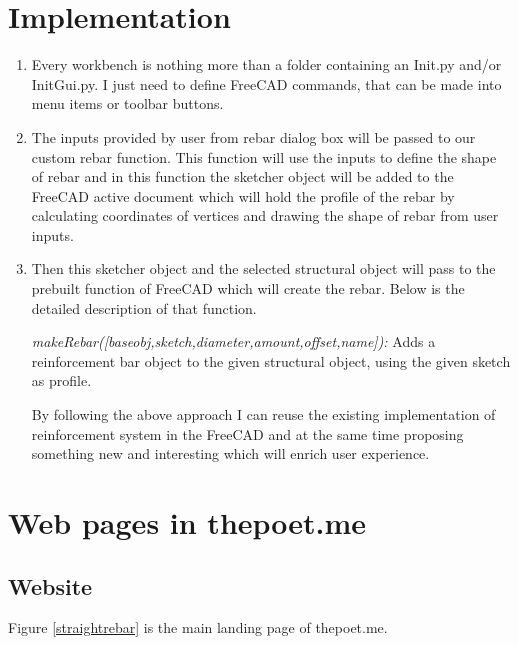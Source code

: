 \section{Implementation}

\begin{enumerate}
\item Every workbench is nothing more than a folder containing an Init.py and/or InitGui.py. I just need to define FreeCAD commands, that can be made into menu items or toolbar buttons.

\item The inputs provided by user from rebar dialog box will be passed to our custom rebar function. This function will use the inputs to define the shape of rebar and in this function the sketcher object will be added to the FreeCAD active document which will hold the profile of the rebar by calculating coordinates of vertices and drawing the shape of rebar from user inputs.

\item Then this sketcher object and the selected structural object will pass to the prebuilt function of FreeCAD which will create the rebar. Below is the detailed description of that function.

\textit{makeRebar([baseobj,sketch,diameter,amount,offset,name]):} Adds a reinforcement bar object to the given structural object, using the given sketch as profile.

By following the above approach I can reuse the existing implementation of reinforcement system in the FreeCAD and at the same time proposing something new and interesting which will enrich user experience.

\end{enumerate}

\section{Web pages in thepoet.me}
\subsection{Website}
Figure \ref{straightrebar} is the main landing page of thepoet.me.

